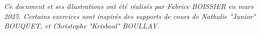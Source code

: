 \documentclass[11pt,a4paper]{article}
\begin{document}
\vspace*{-0.5cm}



\bigskip

\vfillFirst

\vfillLast


\begin{center}
\textit{Ce document et ses illustrations ont été réalisés par Fabrice BOISSIER en mars 2025.
Certains exercices sont inspirés des supports de cours de Nathalie "Junior" BOUQUET, et Christophe "Krisboul" BOULLAY.}
\end{center}
\end{document}
